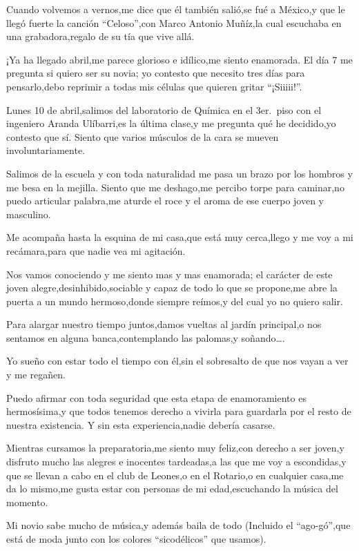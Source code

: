 \documentclass[letterpaper,12pt]{book}
\begin{document}
Cuando volvemos a vernos,me dice que él también salió,se fué a  México,y que le llegó fuerte la canción ``Celoso'',con Marco Antonio Muñíz,la cual escuchaba en una grabadora,regalo de su tía que vive allá. 

¡Ya ha llegado abril,me parece glorioso e idílico,me siento enamorada. El día 7 me pregunta si quiero ser su novia; yo contesto que necesito tres días para pensarlo,debo reprimir a todas mis células que quieren gritar ``¡Siiiii!''.

Lunes 10 de abril,salimos del laboratorio de Química en el 3er.\ piso con el ingeniero Aranda Ulíbarri,es la última clase,y me pregunta qué he decidido,yo contesto que sí. Siento que varios músculos de la cara se mueven involuntariamente.

Salimos de la escuela y con toda naturalidad me pasa un brazo por los hombros y me besa en la mejilla. Siento que me deshago,me percibo torpe para caminar,no puedo articular palabra,me aturde el roce y el aroma de ese cuerpo joven y masculino.

Me acompaña hasta la esquina de mi casa,que está muy cerca,llego y me voy a mi recámara,para que nadie vea mi agitación.

Nos vamos conociendo y me siento mas y mas enamorada; el carácter de este joven alegre,desinhibido,sociable y capaz de todo lo que se propone,me abre la puerta a un mundo hermoso,donde siempre reímos,y del cual yo no quiero salir.

Para alargar nuestro tiempo juntos,damos vueltas al jardín principal,o nos sentamos en alguna banca,contemplando las palomas,y soñando\ldots.

Yo sueño con estar todo el tiempo con él,sin el sobresalto de que nos vayan a ver y me regañen.

Puedo afirmar con toda seguridad que esta etapa de enamoramiento es hermosísima,y que todos tenemos derecho a vivirla para guardarla por el resto de nuestra existencia. Y sin esta experiencia,nadie debería casarse.

Mientras cursamos la preparatoria,me siento muy feliz,con derecho a ser joven,y disfruto mucho las alegres e inocentes tardeadas,a las que me voy a escondidas,y que se llevan a cabo en el club de Leones,o en el Rotario,o en cualquier casa,me da lo mismo,me gusta estar con personas de mi edad,escuchando la música del momento. 

Mi novio sabe mucho de música,y además baila de todo (Incluido el  ``ago-gó'',que está de moda junto con los colores ``sicodélicos'' que usamos).
\end{document}
